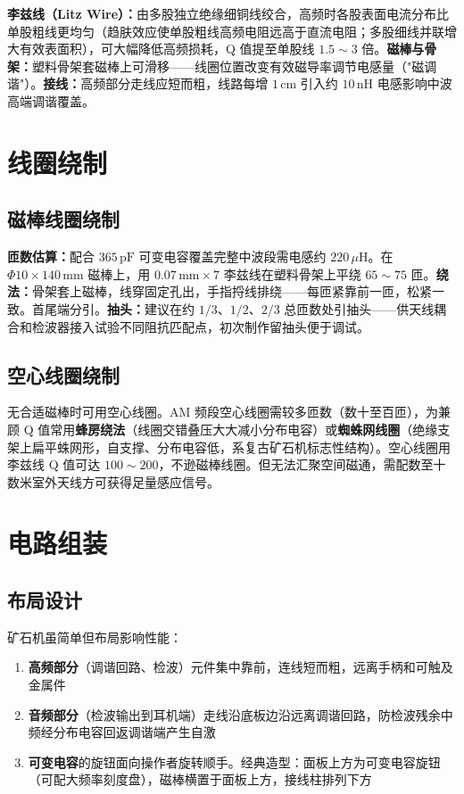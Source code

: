\documentclass[12pt,UTF8]{ctexbook}
\begin{document}
\textbf{李兹线（Litz Wire）：}由多股独立绝缘细铜线绞合，高频时各股表面电流分布比单股粗线更均匀（趋肤效应使单股粗线高频电阻远高于直流电阻；多股细线并联增大有效表面积），可大幅降低高频损耗，Q 值提至单股线 $1.5\sim3$ 倍。\textbf{磁棒与骨架：}塑料骨架套磁棒上可滑移——线圈位置改变有效磁导率调节电感量（"磁调谐"）。\textbf{接线：}高频部分走线应短而粗，线路每增 $1\,\mathrm{cm}$ 引入约 $10\,\mathrm{nH}$ 电感影响中波高端调谐覆盖。

\section{线圈绕制}
\label{sec:crystal_coil_winding}

\subsection{磁棒线圈绕制}

\textbf{匝数估算：}配合 $365\,\mathrm{pF}$ 可变电容覆盖完整中波段需电感约 $220\,\mu\mathrm{H}$。在 $\Phi10\times140\,\mathrm{mm}$ 磁棒上，用 $0.07\,\mathrm{mm}\times7$ 李兹线在塑料骨架上平绕 $65\sim75$ 匝。\textbf{绕法：}骨架套上磁棒，线穿固定孔出，手指捋线排绕——每匝紧靠前一匝，松紧一致。首尾端分引。\textbf{抽头：}建议在约 $1/3$、$1/2$、$2/3$ 总匝数处引抽头——供天线耦合和检波器接入试验不同阻抗匹配点，初次制作留抽头便于调试。

\subsection{空心线圈绕制}

无合适磁棒时可用空心线圈。AM 频段空心线圈需较多匝数（数十至百匝），为兼顾 Q 值常用\textbf{蜂房绕法}（线圈交错叠压大大减小分布电容）或\textbf{蜘蛛网线圈}（绝缘支架上扁平蛛网形，自支撑、分布电容低，系复古矿石机标志性结构）。空心线圈用李兹线 Q 值可达 $100\sim200$，不逊磁棒线圈。但无法汇聚空间磁通，需配数至十数米室外天线方可获得足量感应信号。

\section{电路组装}
\label{sec:crystal_assembly}

\subsection{布局设计}

矿石机虽简单但布局影响性能：
\begin{enumerate}
\item \textbf{高频部分}（调谐回路、检波）元件集中靠前，连线短而粗，远离手柄和可触及金属件
\item \textbf{音频部分}（检波输出到耳机端）走线沿底板边沿远离调谐回路，防检波残余中频经分布电容回返调谐端产生自激
\item \textbf{可变电容}的旋钮面向操作者旋转顺手。经典造型：面板上方为可变电容旋钮（可配大频率刻度盘），磁棒横置于面板上方，接线柱排列下方
\end{enumerate}
\end{document}
